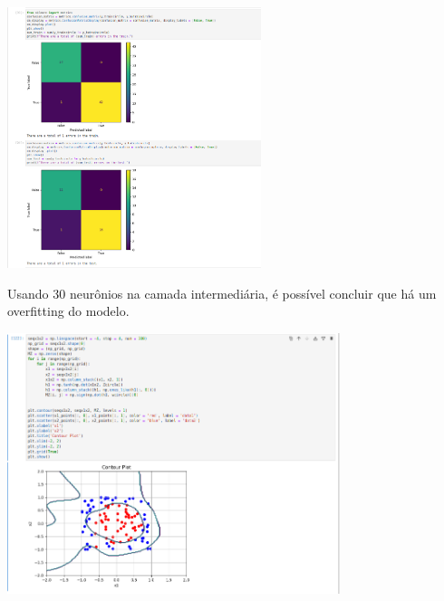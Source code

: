 \documentclass{article}
\begin{document}
\begin{center}

\includegraphics[height=3in]{exercise_pic/circle/conf_matrix_10.png}
\vspace{10pt}
    
\end{center}
Usando 30 neurônios na camada intermediária, é possível concluir que há um overfitting do modelo.

\begin{center}

\includegraphics[height=3in]{exercise_pic/circle/plot_graph_30.png}
\vspace{10pt}

\end{center}
\end{document}
